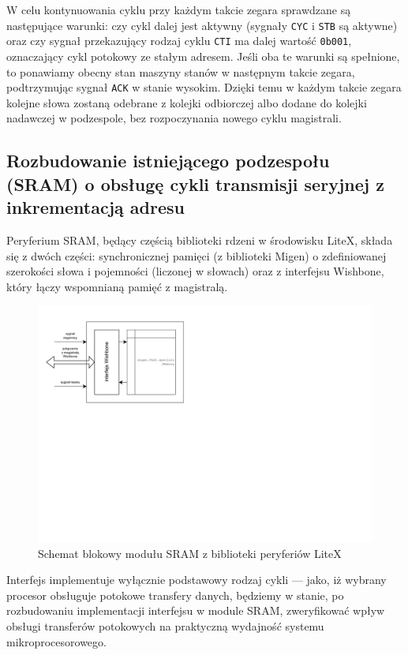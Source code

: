 W celu kontynuowania cyklu przy każdym takcie zegara sprawdzane są następujące warunki: czy cykl dalej jest aktywny (sygnały \texttt{CYC} i \texttt{STB} są aktywne) oraz czy sygnał przekazujący rodzaj cyklu \texttt{CTI} ma dalej wartość \texttt{0b001}, oznaczający cykl potokowy ze stałym adresem. Jeśli oba te warunki są spełnione, to ponawiamy obecny stan maszyny stanów w następnym takcie zegara, podtrzymując sygnał \texttt{ACK} w stanie wysokim. Dzięki temu w każdym takcie zegara kolejne słowa zostaną odebrane z kolejki odbiorczej albo dodane do kolejki nadawczej w podzespole, bez rozpoczynania nowego cyklu magistrali.

\subsection{Rozbudowanie istniejącego podzespołu (SRAM) o obsługę cykli transmisji seryjnej z inkrementacją adresu}

Peryferium SRAM, będący częścią biblioteki rdzeni w środowisku LiteX, składa się z dwóch części: synchronicznej pamięci (z biblioteki Migen) o zdefiniowanej szerokości słowa i pojemności (liczonej w słowach) oraz z interfejsu Wishbone, który łączy wspomnianą pamięć z magistralą.

\begin{figure}[H]
    \centering
    \includegraphics[scale=1,trim={0.5cm 8.5cm 9.5cm 1cm},clip]{implementation/memory-peripheral-diag.pdf}
    \caption{Schemat blokowy modułu SRAM z biblioteki peryferiów LiteX}
    \label{fig:memory-peripheral-diag}
\end{figure}

Interfejs implementuje wyłącznie podstawowy rodzaj cykli --- jako, iż wybrany procesor obsługuje potokowe transfery danych, będziemy w stanie, po rozbudowaniu implementacji interfejsu w module SRAM, zweryfikować wpływ obsługi transferów potokowych na praktyczną wydajność systemu mikroprocesorowego.

